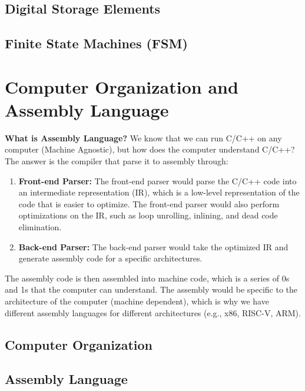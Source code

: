 \documentclass[11pt]{report}
\begin{document}
\section{Digital Storage Elements}

\section{Finite State Machines (FSM)}

\chapter{Computer Organization and Assembly Language}
\begin{shaded}
\textbf{What is Assembly Language?} We know that we can run C/C++ on any computer (Machine Agnostic), but how does the computer understand C/C++? The answer is the compiler that parse it to assembly through:

\begin{enumerate}
    \item \textbf{Front-end Parser:} The front-end parser would parse the C/C++ code into an intermediate representation (IR), which is a low-level representation of the code that is easier to optimize. The front-end parser would also perform optimizations on the IR, such as loop unrolling, inlining, and dead code elimination.
    \item \textbf{Back-end Parser:} The back-end parser would take the optimized IR and generate assembly code for a specific architectures.
\end{enumerate}
\end{shaded}
The assembly code is then assembled into machine code, which is a series of 0s and 1s that the computer can understand. The assembly would be specific to the architecture of the computer (machine dependent), which is why we have different assembly languages for different architectures (e.g., x86, RISC-V, ARM).
\section{Computer Organization}

\section{Assembly Language}
\end{document}
